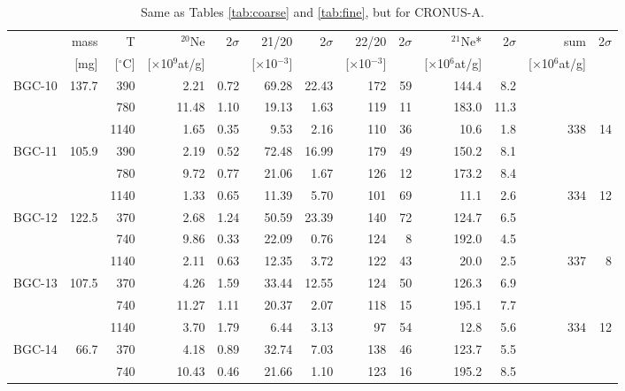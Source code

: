 \documentclass[authoryear,review,12pt]{elsarticle}
\begin{document}
\begin{table}
\caption{Same as Tables \ref{tab:coarse} and \ref{tab:fine}, but for CRONUS-A.} \label{tab:cronus-a}
    \begin{tabular}{|r|rrrrrrrrrrrr|}
\hline
          & mass  & T     & $^{20}$Ne  & 2$\sigma$    & 21/20 & 2$\sigma$    & 22/20 & 2$\sigma$    & $^{21}$Ne* & 
2$\sigma$    & sum   & 2$\sigma$ \\ 
          & [mg]    & [$^\circ$C]   & [$\times$10$^9$at/g] & & [$\times$10$^{-3}$] & 
 & [$\times$10$^{-3}$] & & [$\times$10$^6$at/g] & & 
[$\times$10$^6$at/g] & \\ \hline
    BGC-10 & 137.7 & 390   & 2.21  & 0.72  & 69.28 & 22.43 & 172   & 59    & 144.4 & 8.2   &       &  \\
    \hline
          &       & 780   & 11.48 & 1.10  & 19.13 & 1.63  & 119   & 11    & 183.0 & 11.3  &       &  \\
          &       & 1140  & 1.65  & 0.35  & 9.53  & 2.16  & 110   & 36    & 10.6  & 1.8   & 338   & 14 \\
    BGC-11 & 105.9 & 390   & 2.19  & 0.52  & 72.48 & 16.99 & 179   & 49    & 150.2 & 8.1   &       &  \\
          &       & 780   & 9.72  & 0.77  & 21.06 & 1.67  & 126   & 12    & 173.2 & 8.4   &       &  \\
          &       & 1140  & 1.33  & 0.65  & 11.39 & 5.70  & 101   & 69    & 11.1  & 2.6   & 334   & 12 \\
    BGC-12 & 122.5 & 370   & 2.68  & 1.24  & 50.59 & 23.39 & 140   & 72    & 124.7 & 6.5   &       &  \\
          &       & 740   & 9.86  & 0.33  & 22.09 & 0.76  & 124   & 8     & 192.0 & 4.5   &       &  \\
          &       & 1140  & 2.11  & 0.63  & 12.35 & 3.72  & 122   & 43    & 20.0  & 2.5   & 337   & 8 \\
    BGC-13 & 107.5 & 370   & 4.26  & 1.59  & 33.44 & 12.55 & 124   & 50    & 126.3 & 6.9   &       &  \\
          &       & 740   & 11.27 & 1.11  & 20.37 & 2.07  & 118   & 15    & 195.1 & 7.7   &       &  \\
          &       & 1140  & 3.70  & 1.79  & 6.44  & 3.13  & 97    & 54    & 12.8  & 5.6   & 334   & 12 \\
    BGC-14 & 66.7  & 370   & 4.18  & 0.89  & 32.74 & 7.03  & 138   & 46    & 123.7 & 5.5   &       &  \\
          &       & 740   & 10.43 & 0.46  & 21.66 & 1.10  & 123   & 16    & 195.2 & 8.5   &       &  \\

\end{tabular}
\end{table}
\end{document}
